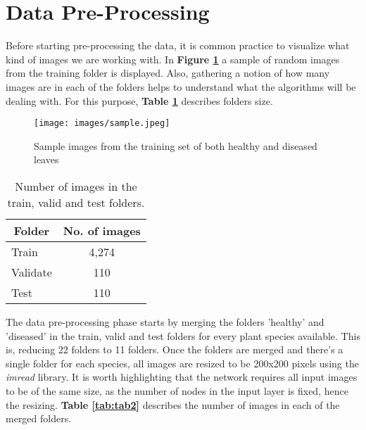 \documentclass[11pt]{article}
\begin{document}
\clearpage

\section{Data Pre-Processing} \label{Section2}

 Before starting pre-processing the data, it is common practice to visualize what kind of images we are working with. In \textbf{Figure \ref{fig:Fig2}} a sample of random images from the training folder is displayed. Also, gathering a notion of how many images are in each of the folders helps to understand what the algorithms will be dealing with. For this purpose, \textbf{Table \ref{tab:tab1}} describes folders size.\\

 \begin{figure}[H]
    \centering
    \texttt{[image: images/sample.jpeg]}
    \caption{Sample images from the training set of both healthy and diseased leaves}
    \label{fig:Fig2}
\end{figure}


\begin{table}[H]
    \begin{center}
    
    \begin{tabular}{lc}
    \multicolumn{1}{c}{\textbf{Folder}} & \multicolumn{1}{c}{\textbf{No. of images}} \\ \hline
        Train & 4,274 \\
        Validate & 110 \\
        Test & 110  \\ \hline
    \end{tabular}
    \caption{Number of images in the train, valid and test folders.} \label{tab:tab1}
    
    \end{center}
\end{table}

The data pre-processing phase starts by merging the folders 'healthy' and 'diseased' in the train, valid and test folders for every plant species available. This is, reducing 22 folders to 11 folders. Once the folders are merged and there's a single folder for each species, all images are resized to be 200x200 pixels using the \textit{imread} library. It is worth highlighting that the network requires all input images to be of the same size, as the number of nodes in the input layer is fixed, hence the resizing. \textbf{Table \ref{tab:tab2}} describes the number of images in each of the merged folders. \\
\end{document}
